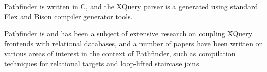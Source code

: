 Pathfinder is written in C, and the XQuery parser is a generated using standard
Flex and Bison compiler generator tools.

Pathfinder is and has been a subject of extensive research on coupling XQuery
frontends with relational databases, and a number of papers have been written 
on various areas of interest in the context of Pathfinder, such as compilation
techniques for relational targets\cite{pathfinder_comptech} and loop-lifted
staircase joins\cite{pathfinder_staircase}.
